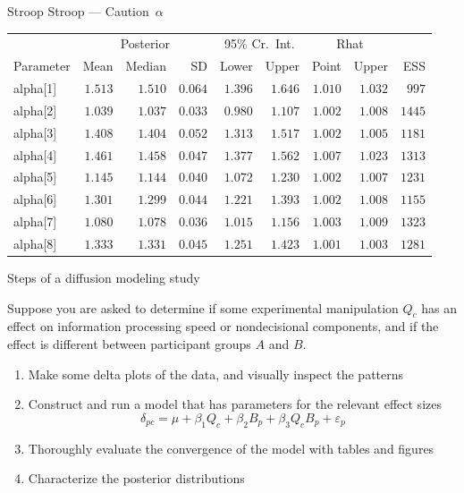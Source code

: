 \documentclass[aspectratio=169]{beamer}
\begin{document}
\begin{frame}[fragile]{Stroop Stroop --- Caution~$\alpha$}
\begin{table}[h]
	\centering\scriptsize
	\label{tab:mCMCSummary}
	{
		\begin{tabular}{lrrrrrrrr}
			\toprule
			\multicolumn{1}{c}{} & \multicolumn{3}{c}{Posterior} & \multicolumn{2}{c}{95\% Cr.\ Int.} & \multicolumn{2}{c}{Rhat} & \multicolumn{1}{c}{} \\
			\cline{2-4}\cline{5-6}\cline{7-8}
			Parameter & Mean & Median & SD & Lower & Upper & Point & Upper & ESS  \\
			\cmidrule[0.4pt]{1-9}
			alpha[1] & $1.513$ & $1.510$ & $0.064$ & $1.396$ & $1.646$ & $1.010$ & $1.032$ & $997$  \\
			alpha[2] & $1.039$ & $1.037$ & $0.033$ & $0.980$ & $1.107$ & $1.002$ & $1.008$ & $1445$  \\
			alpha[3] & $1.408$ & $1.404$ & $0.052$ & $1.313$ & $1.517$ & $1.002$ & $1.005$ & $1181$  \\
			alpha[4] & $1.461$ & $1.458$ & $0.047$ & $1.377$ & $1.562$ & $1.007$ & $1.023$ & $1313$  \\
			alpha[5] & $1.145$ & $1.144$ & $0.040$ & $1.072$ & $1.230$ & $1.002$ & $1.007$ & $1231$  \\
			alpha[6] & $1.301$ & $1.299$ & $0.044$ & $1.221$ & $1.393$ & $1.002$ & $1.008$ & $1155$  \\
			alpha[7] & $1.080$ & $1.078$ & $0.036$ & $1.015$ & $1.156$ & $1.003$ & $1.009$ & $1323$  \\
			alpha[8] & $1.333$ & $1.331$ & $0.045$ & $1.251$ & $1.423$ & $1.001$ & $1.003$ & $1281$  \\
			\bottomrule
		\end{tabular}
	}
\end{table}
\nocite{zhang2014time}

\end{frame}

\begin{frame}{Steps of a diffusion modeling study}

Suppose you are asked to determine if some experimental manipulation $Q_c$ has an effect on information processing speed or nondecisional components, and if the effect is different between participant groups $A$ and $B$.

\begin{enumerate}
\item Make some delta plots of the data, and visually inspect the patterns
\item Construct and run a model that has parameters for the relevant effect sizes
$$\delta_{pc} = \mu + \beta_1 Q_c + \beta_2 B_p + \beta_3 Q_c B_p + \varepsilon_p $$
\item Thoroughly evaluate the convergence of the model with tables and figures
\item Characterize the posterior distributions
\end{enumerate}

\end{frame}


\maketitle
\end{document}
